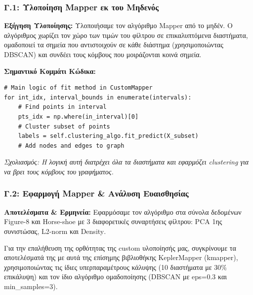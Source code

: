 \documentclass[12pt]{article}
\newcommand{\en}[1]{\foreignlanguage{english}{#1}}
\begin{document}
\subsubsection{Γ.1: Υλοποίηση \foreignlanguage{english}{Mapper} εκ του Μηδενός}
\vspace{0.5em}

\vspace{1em}
\textbf{Εξήγηση Υλοποίησης:}
Υλοποιήσαμε τον αλγόριθμο \foreignlanguage{english}{Mapper} από το μηδέν. Ο αλγόριθμος χωρίζει τον χώρο των τιμών του φίλτρου σε επικαλυπτόμενα διαστήματα, ομαδοποιεί τα σημεία που αντιστοιχούν σε κάθε διάστημα (χρησιμοποιώντας \foreignlanguage{english}{DBSCAN}) και συνδέει τους κόμβους που μοιράζονται κοινά σημεία.

\vspace{1em}
\textbf{Σημαντικό Κομμάτι Κώδικα:}
\begin{lstlisting}
# Main logic of fit method in CustomMapper
for int_idx, interval_bounds in enumerate(intervals):
    # Find points in interval
    pts_idx = np.where(in_interval)[0]
    # Cluster subset of points
    labels = self.clustering_algo.fit_predict(X_subset)
    # Add nodes and edges to graph
\end{lstlisting}
\textit{Σχολιασμός: Η λογική αυτή διατρέχει όλα τα διαστήματα και εφαρμόζει \en{clustering} για να βρει τους κόμβους του γραφήματος.}

\subsubsection{Γ.2: Εφαρμογή \foreignlanguage{english}{Mapper} \& Ανάλυση Ευαισθησίας}
\vspace{0.5em}

\vspace{1em}
\textbf{Αποτελέσματα \& Ερμηνεία:}
Εφαρμόσαμε τον αλγόριθμο στα σύνολα δεδομένων \foreignlanguage{english}{Figure-8} και \foreignlanguage{english}{Horse-shoe} με 3 διαφορετικές συναρτήσεις φίλτρου: \foreignlanguage{english}{PCA} 1ης συνιστώσας, \foreignlanguage{english}{L2-norm} και \foreignlanguage{english}{Density}.

Για την επαλήθευση της ορθότητας της \foreignlanguage{english}{custom} υλοποίησής μας, συγκρίνουμε τα αποτελέσματά της με αυτά της επίσημης βιβλιοθήκης \foreignlanguage{english}{KeplerMapper} (\foreignlanguage{english}{kmapper}), χρησιμοποιώντας τις ίδιες υπερπαραμέτρους κάλυψης (10 διαστήματα με 30\% επικάλυψη) και τον ίδιο αλγόριθμο ομαδοποίησης (\foreignlanguage{english}{DBSCAN} με \foreignlanguage{english}{eps=0.3} και \foreignlanguage{english}{min\_samples=3}).
\end{document}
